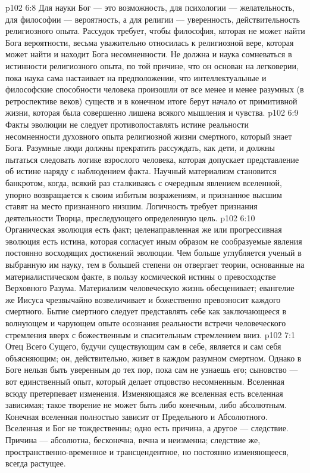 \vs p102 6:8 \pc Для науки Бог --- это возможность, для психологии --- желательность, для философии --- вероятность, а для религии --- уверенность, действительность религиозного опыта. Рассудок требует, чтобы философия, которая не может найти Бога вероятности, весьма уважительно относилась к религиозной вере, которая может найти и находит Бога несомненности. Не должна и наука сомневаться в истинности религиозного опыта, по той причине, что он основан на легковерии, пока наука сама настаивает на предположении, что интеллектуальные и философские способности человека произошли от все менее и менее разумных (в ретроспективе веков) существ и в конечном итоге берут начало от примитивной жизни, которая была совершенно лишена всякого мышления и чувства.
\vs p102 6:9 Факты эволюции не следует противопоставлять истине реальности несомненности духовного опыта религиозной жизни смертного, который знает Бога. Разумные люди должны прекратить рассуждать, как дети, и должны пытаться следовать логике взрослого человека, которая допускает представление об истине наряду с наблюдением факта. Научный материализм становится банкротом, когда, всякий раз сталкиваясь с очередным явлением вселенной, упорно возвращается к своим избитым возражениям, и признанное высшим ставят на место признанного низшим. Логичность требует признания деятельности Творца, преследующего определенную цель.
\vs p102 6:10 Органическая эволюция есть факт; целенаправленная же или прогрессивная эволюция есть истина, которая согласует иным образом не сообразуемые явления постоянно восходящих достижений эволюции. Чем больше углубляется ученый в выбранную им науку, тем в большей степени он отвергает теории, основанные на материалистическом факте, в пользу космической истины о превосходстве Верховного Разума. Материализм человеческую жизнь обесценивает; евангелие же Иисуса чрезвычайно возвеличивает и божественно превозносит каждого смертного. Бытие смертного следует представлять себе как заключающееся в волнующем и чарующем опыте осознания реальности встречи человеческого стремления вверх с божественным и спасительным стремлением вниз.
\vs p102 7:1 Отец Всего Сущего, будучи существующим сам в себе, является и сам себя объясняющим; он, действительно, живет в каждом разумном смертном. Однако в Боге нельзя быть уверенным до тех пор, пока сам не узнаешь его; сыновство --- вот единственный опыт, который делает отцовство несомненным. Вселенная всюду претерпевает изменения. Изменяющаяся же вселенная есть вселенная зависимая; такое творение не может быть либо конечным, либо абсолютным. Конечная вселенная полностью зависит от Предельного и Абсолютного. Вселенная и Бог не тождественны; одно есть причина, а другое --- следствие. Причина --- абсолютна, бесконечна, вечна и неизменна; следствие же, пространственно\hyp{}временное и трансцендентное, но постоянно изменяющееся, всегда растущее.
